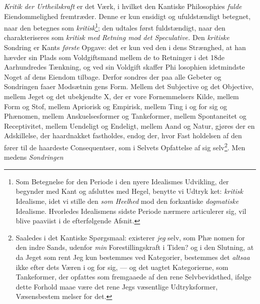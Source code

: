 \emph{Kritik der Urtheilskraft} er det Værk, i hvilket den
Kantiske Philosophies \emph{fulde} Eiendommelighed fremtræder.
Denne er kun ensidigt og ufuldstændigt betegnet, naar den
betegnes som \emph{kritisk}\footnote{Som Betegnelse for den Periode i den nyere
Idealismes Udvikling, der begynder med Kant og afsluttes med Hegel, benytte vi
Udtryk\-%
ket: \emph{kritisk} Idealisme, idet vi stille den \emph{som Heelhed} mod den
forkantiske \emph{dogmatiske} Idealisme. Hvorledes Idealismens sidste Periode
nærmere articulerer sig, vil blive paaviist i de efterfølgende Afsnit.}; den
udtales først fuldstændigt, naar
den charakteriseres som \emph{kritisk med Retning mod det
Speculative.} Den \emph{kritiske} Sondring er Kants \emph{første}
Opgave: det er kun ved den i dens Strænghed, at han hævder
sin Plads som Voldgiftsmand mellem de to Retninger i det
18de Aarhundredes Tænkning, og ved sin Voldgift skaffer Phi\-%
losophien idetmindste Noget af dens Eiendom tilbage. Derfor
sondres der paa alle Gebeter og Sondringen faaer Modsætnin\-%
gens Form. Mellem det Subjective og det Objective, mellem
Jeget og det ubekjendte X, der er vore Fornemmelsers Kilde,
mellem Form og Stof, mellem Apriorisk og Empirisk, mellem
Ting i og for sig og Phænomen, mellem Anskuelsesformer og
Tankeformer, mellem Spontaneitet og Receptivitet, mellem
Uendeligt og Endeligt, mellem Aand og Natur, gjøres der en
Adskillelse, der haardnakket fastholdes, endog der, hvor Fast\-%
\setcounter{footnote}{0}%
holdelsen af den fører til de haardeste Consequentser, som i
Selvets Opfattelse af sig selv\footnote{Saaledes i det Kantiske Spørgsmaal:
existerer \emph{jeg} selv, som Phæ\-%
nomen for den indre Sands, udenfor \emph{min} Forestillingskraft i Tiden?
og i den Slutning, at da Jeget som rent Jeg kun bestemmes ved
Kategorier, bestemmes det \emph{altsaa} ikke efter dets Væren i og for
sig, --- og det uagtet Kategorierne, som Tankeformer, der opfattes
som fremgaaede af den rene Selvbevidsthed, ifølge dette Forhold
maae være det rene Jegs væsentlige Udtryksformer, Væsensbestem\-%
melser for det.}. Men medens \emph{Sondringen}
